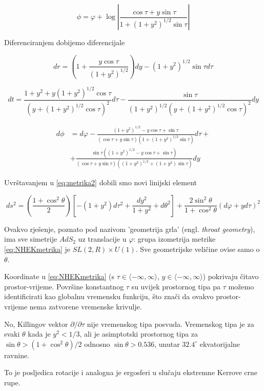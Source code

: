 \begin{equation}
\phi=\varphi+\log\left|\frac{\cos\tau+y\sin\tau}{1+(1+y^2)^{1/2}\sin\tau}\right|
\end{equation}

\noindent Diferenciranjem dobijemo diferencijale

\begin{equation}
dr=\left(1+\frac{y\cos\tau}{(1+y^2)^{1/2}}\right)dy-(1+y^2)^{1/2}\sin\tau d\tau
\end{equation}

\begin{equation}
dt=\frac{1+y^2+y(1+y^2)^{1/2}\cos\tau}{(y+(1+y^2)^{1/2}\cos\tau)^2}d\tau-\frac{\sin\tau}{(1+y^2)^{1/2}(y+(1+y^2)^{1/2}\cos\tau)^2}dy
\end{equation}

\begin{equation}
\begin{split}
d\phi&=d\varphi-\frac{(1+y^2)^{1/2}-y\cos\tau+\sin\tau}{(\cos\tau+y\sin\tau)\left(1+(1+y^2)^{1/2}\sin\tau\right)}d\tau+\\
&+\frac{\sin\tau\left((1+y^2)^{1/2}-y\cos\tau+\sin\tau\right)}{(\cos\tau+y\sin\tau)\left((1+y^2)^{1/2}+(1+y^2)\sin\tau\right)}dy
\end{split}
\end{equation}

\noindent Uvrštavanjem u \eqref{eq:metrika2} dobili smo novi linijski element

\begin{equation}
ds^2=\left(\frac{1+\cos^2\theta}{2}\right)\left[-(1+y^2)d\tau^2+\frac{dy^2}{1+y^2}+d\theta^2\right]+\frac{2\sin^2\theta}{1+\cos^2\theta}(d\varphi+yd\tau)^2
\label{eq:NHEKmetrika}
\end{equation}

\noindent Ovakvo rješenje, poznato pod nazivom 'geometrija grla' (engl. \textit{throat geometry}), ima sve simetrije $AdS_2$ uz translacije u $\varphi$: grupa izometrija metrike \eqref{eq:NHEKmetrika} je $SL(2,R)\times U(1)$. Sve geometrijske veličine ovise samo o $\theta$. 

\noindent Koordinate u \eqref{eq:NHEKmetrika} (s $\tau\in \langle -\infty,\infty\rangle$, $y\in \langle -\infty,\infty\rangle$) pokrivaju čitavo prostor-vrijeme. Površine konstantnog $\tau$ su uvijek prostornog tipa pa $\tau$ možemo identificirati kao globalnu vremensku funkciju, što znači da ovakvo prostor-vrijeme nema zatvorene vremenske krivulje.

\noindent No, Killingov vektor $\partial/\partial\tau$ nije vremenskog tipa posvuda. Vremenskog tipa je za svaki $\theta$ kada je $y^2<1/3$, ali je asimptotski prostornog tipa za $\sin\theta>(1+\cos^2\theta)/2$ odnosno $\sin\theta>0.536$, unutar $32.4^\circ$ ekvatorijalne ravnine. 

\noindent To je posljedica rotacije i analogna je ergosferi u slučaju ekstremne Kerrove crne rupe.